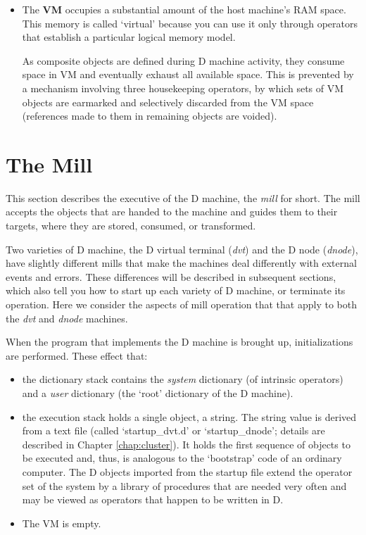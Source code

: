 \begin{itemize}
\item The \textbf{VM} occupies a substantial amount of the host machine's RAM space.  This memory is  called  `virtual'  because  you can  use it  only  through operators that establish a particular logical memory model.

As composite objects are defined during D machine activity,  they consume space in VM and eventually exhaust all available space. This is prevented by a mechanism involving three housekeeping operators, by which sets of VM objects are earmarked and selectively discarded from the VM space (references made to them in remaining objects are voided). 
\end{itemize} 



\section{The Mill}\label{sec:mill}

This  section describes the executive of the D machine, the \emph{mill} for short.  The mill accepts the objects that are handed to the machine and guides  them  to their targets,  where  they  are  stored,  consumed,  or transformed.

Two varieties of D machine, the D virtual terminal (\emph{dvt}) and the D node (\emph{dnode}), have slightly different mills that make the machines deal differently with  external events and errors. These differences will be described in subsequent sections, which also tell you how to start up each variety of D machine, or terminate its operation. Here we consider the aspects of mill operation that that apply to both the \emph{dvt} and \emph{dnode} machines.

When  the  program  that  implements  the  D  machine  is  brought   up, initializations are performed. These effect that:

\begin{itemize}
\item the  dictionary stack contains the \emph{system} dictionary  (of  intrinsic operators) and a \emph{user} dictionary (the `root' dictionary of the D machine).
\item the execution stack holds a single object, a string. The string value is  derived  from a text file (called `startup\_dvt.d' or `startup\_dnode'; details are described in Chapter \ref{chap:cluster}). It holds the first sequence  of  objects  to be executed and,  thus,  is  analogous  to  the `bootstrap'  code  of an ordinary computer. The D objects imported from the startup file extend the operator set of the system by a library of procedures that are needed very often and may be viewed as operators that happen to be written in D.
\item The VM is empty.
\end{itemize}

